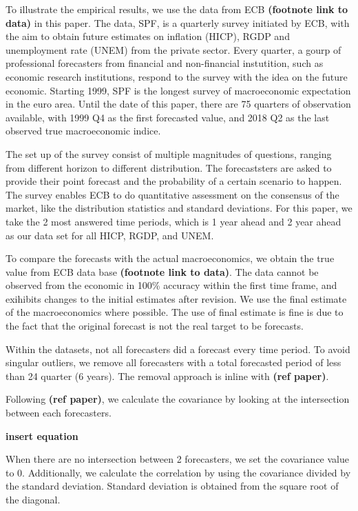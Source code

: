 \documentclass[]{article}
\begin{document}
To illustrate the empirical results, we use the data from ECB
\textbf{(footnote link to data)} in this paper. The data, SPF, is a
quarterly survey initiated by ECB, with the aim to obtain future
estimates on inflation (HICP), RGDP and unemployment rate (UNEM) from
the private sector. Every quarter, a gourp of professional forecasters
from financial and non-financial instutition, such as economic research
institutions, respond to the survey with the idea on the future
economic. Starting 1999, SPF is the longest survey of macroeconomic
expectation in the euro area. Until the date of this paper, there are 75
quarters of observation available, with 1999 Q4 as the first forecasted
value, and 2018 Q2 as the last observed true macroeconomic indice.

The set up of the survey consist of multiple magnitudes of questions,
ranging from different horizon to different distribution. The
forecaststers are asked to provide their point forecast and the
probability of a certain scenario to happen. The survey enables ECB to
do quantitative assessment on the consensus of the market, like the
distribution statistics and standard deviations. For this paper, we take
the 2 most answered time periods, which is 1 year ahead and 2 year ahead
as our data set for all HICP, RGDP, and UNEM.

To compare the forecasts with the actual macroeconomics, we obtain the
true value from ECB data base \textbf{(footnote link to data)}. The data
cannot be observed from the economic in 100\% accuracy within the first
time frame, and exihibits changes to the initial estimates after
revision. We use the final estimate of the macroeconomics where
possible. The use of final estimate is fine is due to the fact that the
original forecast is not the real target to be forecasts.

Within the datasets, not all forecasters did a forecast every time
period. To avoid singular outliers, we remove all forecasters with a
total forecasted period of less than 24 quarter (6 years). The removal
approach is inline with \textbf{(ref paper)}.

Following \textbf{(ref paper)}, we calculate the covariance by looking
at the intersection between each forecasters.

\textbf{insert equation}

When there are no intersection between 2 forecasters, we set the
covariance value to 0. Additionally, we calculate the correlation by
using the covariance divided by the standard deviation. Standard
deviation is obtained from the square root of the diagonal.
\end{document}

